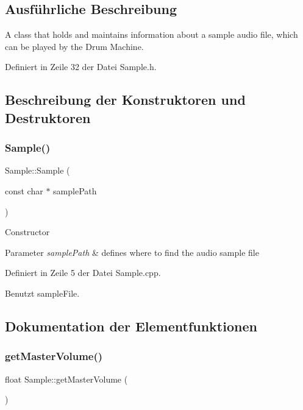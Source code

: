 \subsection{Ausführliche Beschreibung}
A class that holds and maintains information about a sample audio file, which can be played by the Drum Machine. 

Definiert in Zeile 32 der Datei Sample.\+h.



\subsection{Beschreibung der Konstruktoren und Destruktoren}
\mbox{\label{class_sample_a7aea6b090998a430341aa6d1d6222c63}} 
\subsubsection{\texorpdfstring{Sample()}{Sample()}}
{\footnotesize\ttfamily Sample\+::\+Sample (\begin{DoxyParamCaption}\item[{const char $\ast$}]{sample\+Path }\end{DoxyParamCaption})\hspace{0.3cm}{\ttfamily [explicit]}}

Constructor 
\begin{DoxyParams}{Parameter}
{\em sample\+Path} & defines where to find the audio sample file \\
\hline
\end{DoxyParams}


Definiert in Zeile 5 der Datei Sample.\+cpp.



Benutzt sample\+File.



\subsection{Dokumentation der Elementfunktionen}
\mbox{\label{class_sample_afceddb412ab50a67cb98ca6b72456f24}} 
\subsubsection{\texorpdfstring{get\+Master\+Volume()}{getMasterVolume()}}
{\footnotesize\ttfamily float Sample\+::get\+Master\+Volume (\begin{DoxyParamCaption}{ }\end{DoxyParamCaption})\hspace{0.3cm}{\ttfamily [private]}}



